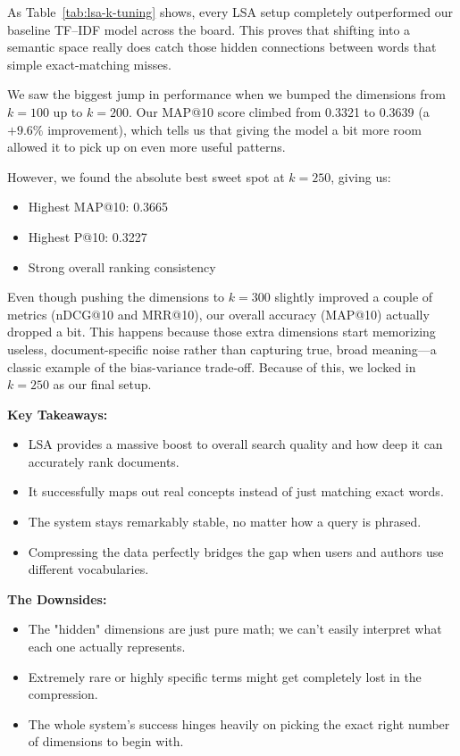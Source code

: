 \documentclass[runningheads]{llncs}
\begin{document}
As Table~\ref{tab:lsa-k-tuning} shows, every LSA setup completely outperformed our baseline TF--IDF model across the board. This proves that shifting into a semantic space really does catch those hidden connections between words that simple exact-matching misses.

We saw the biggest jump in performance when we bumped the dimensions from $k = 100$ up to $k = 200$. Our MAP@10 score climbed from 0.3321 to 0.3639 (a $+9.6\%$ improvement), which tells us that giving the model a bit more room allowed it to pick up on even more useful patterns.

However, we found the absolute best sweet spot at $k = 250$, giving us:

\begin{itemize}[noitemsep]
    \item Highest MAP@10: 0.3665
    \item Highest P@10: 0.3227
    \item Strong overall ranking consistency
\end{itemize}

Even though pushing the dimensions to $k = 300$ slightly improved a couple of metrics (nDCG@10 and MRR@10), our overall accuracy (MAP@10) actually dropped a bit. This happens because those extra dimensions start memorizing useless, document-specific noise rather than capturing true, broad meaning---a classic example of the bias-variance trade-off. Because of this, we locked in $k = 250$ as our final setup.

\textbf{Key Takeaways:}
\begin{itemize}
    \item LSA provides a massive boost to overall search quality and how deep it can accurately rank documents.
    \item It successfully maps out real concepts instead of just matching exact words.
    \item The system stays remarkably stable, no matter how a query is phrased.
    \item Compressing the data perfectly bridges the gap when users and authors use different vocabularies.
\end{itemize}

\textbf{The Downsides:}
\begin{itemize}
    \item The "hidden" dimensions are just pure math; we can't easily interpret what each one actually represents.
    \item Extremely rare or highly specific terms might get completely lost in the compression.
    \item The whole system's success hinges heavily on picking the exact right number of dimensions to begin with.
\end{itemize}
\end{document}

